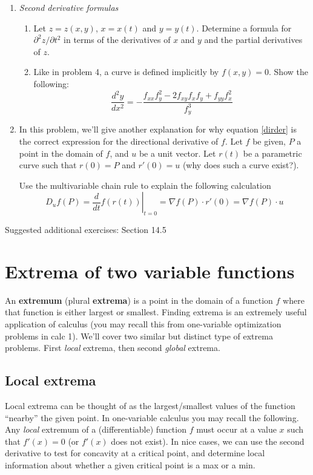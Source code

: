 \documentclass[12pt]{article}
\numberwithin{equation}{subsection}
\numberwithin{figure}{subsection}
\theoremstyle{note}
\begin{document}
{\begin{enumerate}[label=\arabic*.]
\begin{enumerate}
\end{enumerate}

\item \textit{Second derivative formulas}

\begin{enumerate}

\item Let $z=z(x,y)$, $x=x(t)$ and $y=y(t)$. Determine a formula for $\partial^2 z/\partial t^2$ in terms of the derivatives of $x$ and $y$ and the partial derivatives of $z$. 

\item Like in problem 4, a curve is defined implicitly by $f(x,y)=0$. Show the following: \begin{equation} \dfrac{d^2y}{dx^2}=-\dfrac{ f_{xx} f_y^2-2f_{xy}f_xf_y+f_{yy}f_{x}^2}{f_y^3}\end{equation}

\end{enumerate}

\item In this problem, we'll give another explanation for  why equation \eqref{dirder} is the correct expression for the directional derivative of $f$. Let $f$ be given, $P$ a point in the domain of $f$, and $u$ be a unit vector. Let $r(t)$ be a parametric curve such that $r(0)=P$ and $r'(0)=u$ (why does such a curve exist?). 

Use the multivariable chain rule to explain the following calculation \[ D_uf(P)=\left. \dfrac{d}{dt} f(r(t)) \right|_{t=0} = \nabla f(P)  \cdot r'(0)=\nabla f(P)\cdot u \]
\end{enumerate}

Suggested additional exercises: Section 14.5 





\section{Extrema of two variable functions}

An \textbf{extremum} (plural \textbf{extrema}) is a point in the domain of a function $f$ where that function is either largest or smallest. Finding extrema is an extremely useful application of calculus (you may recall this from one-variable optimization problems in calc 1). We'll cover two similar but distinct type of extrema problems. First \textit{local} extrema, then second \textit{global} extrema. 

\subsection{Local extrema}
Local extrema can be thought of as the largest/smallest values of the function ``nearby'' the given point. In one-variable calculus you may recall the following. Any \textit{local} extremum of a (differentiable) function $f$ must occur at a value $x$ such that $f'(x)=0$ (or $f'(x)$ does not exist). In nice cases, we can use the second derivative to test for concavity at a critical point, and determine local information about whether a given critical point is a max or a min.

}
\end{document}
